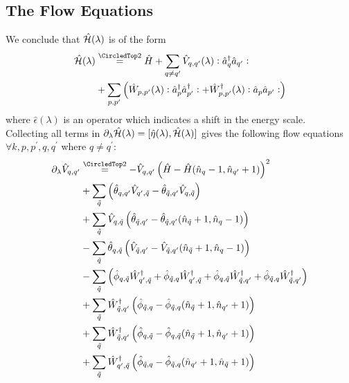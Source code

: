 \begin{appendix}
\subsection{The Flow Equations}
We conclude that $\hat{\mathcal{H}}(\lambda)$ is of the form 
\begin{align}
\ham(\lambda)&\eqsec\hat H+\Sum_{q\neq q^\prime}\hat V_{q,q^\prime}(\lambda)\NO\CR_q\AN_{q^\prime}\NO\\
&+\Sum_{p,p^\prime}\left(\hat W_{p,p^\prime}(\lambda)\NO\CR_p\CR_{p^\prime}\NO+\hat W_{p,p^\prime}^\dagger(\lambda)\NO\AN_p\AN_{p^\prime}\NO\right)\nonumber
\end{align}
where $\hat\epsilon(\lambda)$ is an operator which indicates a shift in the energy scale.\\
Collecting all terms in $\partial_\lambda\hat{\mathcal{H}}(\lambda)=[\hat\eta(\lambda),\hat{\mathcal{H}}(\lambda)]$ gives the following flow equations $\forall k, p,p^\prime, q, q^\prime$ where $q\neq q^\prime$:
\begin{subequations}
\begin{align}
\partial_\lambda\hat V_{q,q^\prime}&\eqsec -\hat V_{q,q^\prime} \left(\hat H - \hat H(\hat n_q-1,\hat n_{q^\prime}+1)\right)^2\label{feq_ndep_I}\\
&+ \Sum_{\tilde q} \left(\hat\theta_{q,q^\prime}\hat V_{q^\prime,\tilde q}-\hat\theta_{\tilde q,q^\prime}\hat V_{q,\tilde q}\right) \nonumber\\
&+\Sum_{\tilde q} \hat V_{q,\tilde q}\left(\hat\theta_{\tilde q,q^\prime}-\hat\theta_{\tilde q,q^\prime}(\hat n_{\tilde q}+1,\hat n_q-1)\right)\nonumber \\
&-\Sum_{\tilde q} \hat \theta_{q,\tilde q}\left(\hat V_{\tilde q,q^\prime}-\hat V_{\tilde q,q^\prime}(\hat n_{\tilde q}+1,\hat n_q-1)\right)\nonumber \\
&-\Sum_{\tilde q} \left(\hat\phi_{q,\tilde q}\hat W_{q^\prime,\tilde q}^\dagger+\hat\phi_{\tilde q,q}\hat W_{q^\prime,\tilde q}^\dagger+\hat\phi_{q,\tilde q}\hat W_{\tilde q,q^\prime}^\dagger  + \hat\phi_{\tilde q,q}\hat W_{\tilde q,q^\prime}^\dagger\right)\nonumber\\
&+\Sum_{\tilde q}\hat W_{\tilde q,q^\prime}^\dagger \left(\hat\phi_{ \tilde q,q}-\hat\phi_{ \tilde q,q}(\hat n_{\tilde q}+1,\hat n_{q^\prime}+1)\right) \nonumber\\
&+\Sum_{\tilde q}\hat W_{\tilde q,q^\prime}^\dagger \left(\hat\phi_{q,\tilde q}-\hat\phi_{q,\tilde q}(\hat n_{\tilde q}+1,\hat n_{q^\prime}+1)\right) \nonumber\\
&+\Sum_{\tilde q}\hat W_{q^\prime,\tilde q}^\dagger \left(\hat\phi_{\tilde q,q}-\hat\phi_{\tilde q,q}(\hat n_{q^\prime}+1,\hat n_{\tilde q}+1)\right) \nonumber\\

\end{align}
\end{subequations}
\end{appendix}
